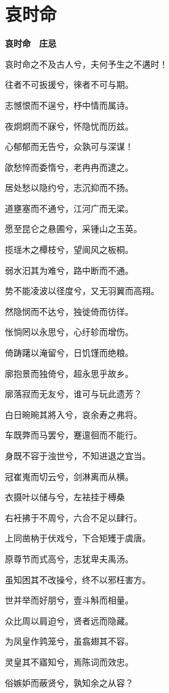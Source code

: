 \documentclass[12pt,a4paper]{ctexbook}
\begin{document}
\section{哀时命}
\textbf{哀时命　庄忌}\par\vspace{0.5em}
哀时命之不及古人兮，夫何予生之不遘时！\par
往者不可扳援兮，徠者不可与期。\par
志憾恨而不逞兮，杼中情而属诗。\par
夜炯炯而不寐兮，怀隐忧而历兹。\par
心郁郁而无告兮，众孰可与深谋！\par
欿愁悴而委惰兮，老冉冉而逮之。\par
居处愁以隐约兮，志沉抑而不扬。\par
道壅塞而不通兮，江河广而无梁。\par
愿至昆仑之悬圃兮，采锺山之玉英。\par
揽瑶木之橝枝兮，望阆风之板桐。\par
弱水汩其为难兮，路中断而不通。\par
势不能凌波以径度兮，又无羽翼而高翔。\par
然隐悯而不达兮，独徙倚而彷徉。\par
怅惝罔以永思兮，心纡轸而增伤。\par
倚踌躇以淹留兮，日饥馑而绝粮。\par
廓抱景而独倚兮，超永思乎故乡。\par
廓落寂而无友兮，谁可与玩此遗芳？\par
白日晼晼其將入兮，哀余寿之弗将。\par
车既弊而马罢兮，蹇邅徊而不能行。\par
身既不容于浊世兮，不知进退之宜当。\par
冠崔嵬而切云兮，剑淋离而从横。\par
衣摄叶以储与兮，左袪挂于榑桑\par
右衽拂于不周兮，六合不足以肆行。\par
上同凿枘于伏戏兮，下合矩矱于虞唐。\par
原尊节而式高兮，志犹卑夫禹汤。\par
虽知困其不改操兮，终不以邪枉害方。\par
世并举而好朋兮，壹斗斛而相量。\par
众比周以肩迫兮，贤者远而隐藏。\par
为凤皇作鹑笼兮，虽翕翅其不容。\par
灵皇其不寤知兮，焉陈词而效忠。\par
俗嫉妒而蔽贤兮，孰知余之从容？\par
\end{document}
